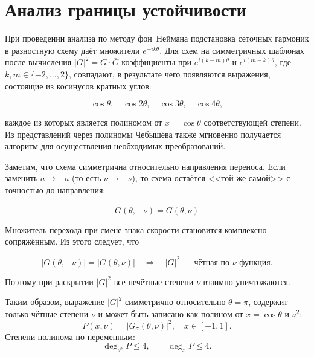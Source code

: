 \documentclass[14pt]{report}
\begin{document}
\section{Анализ границы устойчивости}

При проведении анализа по методу фон~\mbox{Неймана} подстановка сеточных гармоник в разностную схему даёт множители $e^{\pm ik\theta}$. Для схем на симметричных шаблонах после вычисления $|G|^2 = G \cdot \overline{G}$ коэффициенты при $e^{i(k - m)\theta}$ и $e^{i(m - k)\theta}$, где $k, m \in \{-2, \dots, 2\}$, совпадают, в результате чего появляются выражения, состоящие из косинусов кратных углов:

\[
\cos\theta, \quad \cos 2\theta, \quad \cos 3\theta, \quad \cos 4\theta,
\]

каждое из которых является полиномом от $x = \cos\theta$ соответствующей степени. Из представлений через полиномы Чебышёва также мгновенно получается алгоритм для осуществления необходимых преобразований.

Заметим, что схема симметрична относительно направления переноса. Если заменить $a \to -a$ (то есть $\nu \to -\nu$), то схема остаётся <<той же самой>> с точностью до направления:

\[
G(\theta, -\nu) = \overline{G(\theta, \nu)}
\]

Множитель перехода при смене знака скорости становится комплексно-сопряжённым. Из этого следует, что

\[
|G(\theta, -\nu)| = |G(\theta, \nu)| \quad \Rightarrow \quad |G|^2 \text{ --- чётная по }\nu \text{ функция}.
\]

Поэтому при раскрытии $|G|^2$ все нечётные степени $\nu$ взаимно уничтожаются.

Таким образом, выражение $|G|^2$ симметрично относительно $\theta = \pi$, содержит только чётные степени $\nu$ и может быть записано как полином от $x=\cos\theta$ и $\nu^2$:
\begin{equation*}
P(x,\nu) = |G_{\sigma}(\theta,\nu)|^2,\quad x\in[-1,1].
\end{equation*}
Степени полинома по переменным:
\[
\deg_{\nu^2} P \le 4,\qquad \deg_{x} P \le 4.
\]
\end{document}
